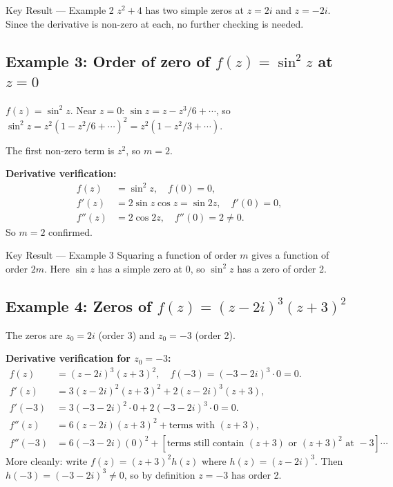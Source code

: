 \documentclass[12pt,a4paper]{article}
\begin{document}
\begin{learnbox}{Key Result --- Example 2}
$z^2+4$ has two simple zeros at $z=2i$ and $z=-2i$. Since the derivative is non-zero at
each, no further checking is needed.
\end{learnbox}

\subsection*{Example 3: Order of zero of $f(z) = \sin^2 z$ at $z = 0$}

$f(z) = \sin^2 z$. Near $z=0$: $\sin z = z - z^3/6 + \cdots$, so
$\sin^2 z = z^2\!\left(1 - z^2/6 + \cdots\right)^{\!2} = z^2\!\left(1 - z^2/3 + \cdots\right)$.

The first non-zero term is $z^2$, so $m = 2$.

\medskip\noindent\textbf{Derivative verification:}
\begin{align*}
  f(z)   &= \sin^2 z,\quad f(0)=0,\\
  f'(z)  &= 2\sin z\cos z = \sin 2z,\quad f'(0)=0,\\
  f''(z) &= 2\cos 2z,\quad f''(0) = 2 \neq 0.
\end{align*}
So $m=2$ confirmed.

\begin{learnbox}{Key Result --- Example 3}
Squaring a function of order $m$ gives a function of order $2m$. Here $\sin z$ has a
simple zero at 0, so $\sin^2 z$ has a zero of order 2.
\end{learnbox}

\subsection*{Example 4: Zeros of $f(z) = (z-2i)^3 (z+3)^2$}

The zeros are $z_0 = 2i$ (order 3) and $z_0 = -3$ (order 2).

\medskip\noindent\textbf{Derivative verification for $z_0=-3$:}
\begin{align*}
  f(z)   &= (z-2i)^3(z+3)^2,\quad f(-3)=(-3-2i)^3\cdot 0 = 0.\\
  f'(z)  &= 3(z-2i)^2(z+3)^2 + 2(z-2i)^3(z+3),\\
  f'(-3) &= 3(-3-2i)^2\cdot 0 + 2(-3-2i)^3\cdot 0 = 0.\\
  f''(z) &= 6(z-2i)(z+3)^2 + \text{terms with }(z+3),\\
  f''(-3)&= 6(-3-2i)(0)^2 + [\text{terms still contain }(z+3)\text{ or }(z+3)^2\text{ at }-3]\cdots
\end{align*}
More cleanly: write $f(z)=(z+3)^2 h(z)$ where $h(z)=(z-2i)^3$.
Then $h(-3)=(-3-2i)^3 \neq 0$, so by definition $z=-3$ has order 2.
\end{document}
